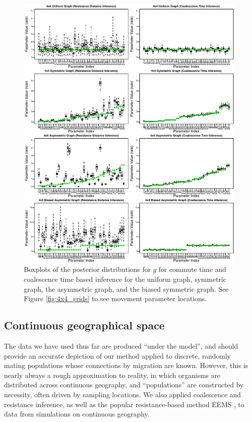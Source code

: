 \documentclass{article}
\begin{document}
\begin{figure}
\centering
     \includegraphics[scale=1]{figs/4x4boxplots_paper}
    \caption{Boxplots of the posterior distributions for $g$ for commute time and coalescence time
    based inference for the uniform graph, symmetric graph, 
    the asymmetric graph, and the biased symmetric graph.
    See Figure \ref{fig:4x4_grids} to see movement parameter locations.}
    \label{fig:4x4box}
\end{figure}


\subsection*{Continuous geographical space}

The data we have used thus far are produced ``under the model'',
and should provide an accurate depiction of our method applied to discrete, randomly mating populations
whose connections by migration are known.
However, this is nearly always a rough approximation to reality,
in which organisms are distributed across continuous geography,
and ``populations'' are constructed by necessity, often driven by sampling locations.
We also applied coalescence and resistance inference,
as well as the popular resistance-based method EEMS \citep{petkova_eems},
to data from simulations on continuous geography.
\end{document}
